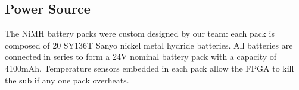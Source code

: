 \subsection{Power Source}
The NiMH battery packs were custom designed by our team: each pack is
composed of 20 SY136T Sanyo nickel metal hydride batteries. All
batteries are connected in series to form a 24V nominal battery pack
with a capacity of 4100mAh. Temperature sensors embedded in each pack allow 
the FPGA to kill the sub if any one pack overheats.
